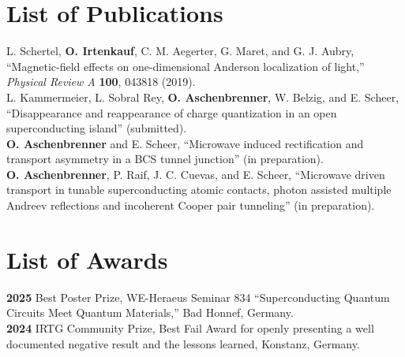 
\pagestyle{eidesstattlicheversicherung}
\thispagestyle{eidesstattlicheversicherung}

\section*{List of Publications}
        \noindent{}L. Schertel, \textbf{O. Irtenkauf}, C. M. Aegerter, G. Maret, and G. J. Aubry, ``Magnetic-field effects on one-dimensional Anderson localization of light,'' \textit{Physical Review A} \textbf{100}, 043818 (2019).\\%

        \noindent{}L. Kammermeier, L. Sobral Rey, \textbf{O. Aschenbrenner}, W. Belzig, and E. Scheer, ``Disappearance and reappearance of charge quantization in an open superconducting island'' (submitted).\\%

        \noindent\textbf{O. Aschenbrenner} and E. Scheer, ``Microwave induced rectification and transport asymmetry in a BCS tunnel junction'' (in preparation).\\%

        \noindent\textbf{O. Aschenbrenner}, P. Raif, J. C. Cuevas, and E. Scheer, ``Microwave driven transport in tunable superconducting atomic contacts, photon assisted multiple Andreev reflections and incoherent Cooper pair tunneling'' (in preparation).

\section*{List of Awards}
    \noindent{}\textbf{2025} Best Poster Prize, WE-Heraeus Seminar 834 ``Superconducting Quantum Circuits Meet Quantum Materials,'' Bad Honnef, Germany.\\%

    \noindent{}\textbf{2024} IRTG Community Prize, Best Fail Award for openly presenting a well documented negative result and the lessons learned, Konstanz, Germany.\\%

